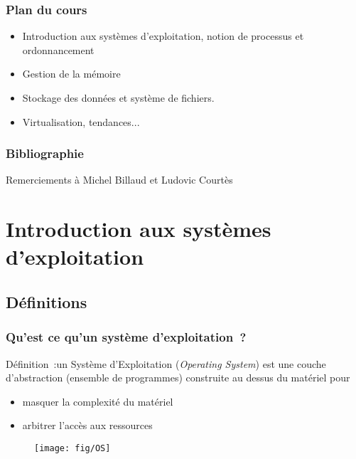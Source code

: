 \begin{frame}
  \frametitle{Plan du cours}
  \begin{itemize}
  \item Introduction aux systèmes d'exploitation, notion de processus et ordonnancement
  \item Gestion de la mémoire
  \item Stockage des données et système de fichiers.
  \item Virtualisation, tendances...
  \end{itemize}
  \end{frame}

\begin{frame}
\frametitle{Bibliographie}

\small
\nocite{*}    
  
\vspace{0.5cm}    
Remerciements à Michel Billaud et Ludovic Courtès
\end{frame}

\section{Introduction aux systèmes d'exploitation}

\subsection{Définitions}
\begin{frame}
\frametitle{Qu'est ce qu'un système d'exploitation~?}
{Définition}~:\alert{un Système d'Exploitation} (\emph{Operating System}) est une
\alert{couche d'abstraction} (ensemble de programmes) construite au dessus du matériel pour
\begin{itemize}
\item masquer la complexité du matériel
\item arbitrer l'accès aux ressources
\end{itemize}
\begin{figure}[h]
  \begin{minipage}[t]{\linewidth}
    \center
    \texttt{[image: fig/OS]}
  \end{minipage}
\end{figure}
\end{frame}



